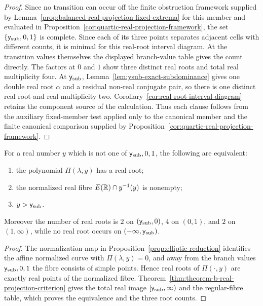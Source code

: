 \begin{proof}
Since no transition can occur off the finite obstruction framework supplied by Lemma~\ref{prop:balanced-real-projection-fixed-extrema} for this member and evaluated in Proposition~\ref{cor:quartic-real-projection-framework}, the set \(\{\mathsf{y}_{\mathrm{sub}},0,1\}\) is complete.  Since each of its three points separates adjacent cells with different counts, it is minimal for this real-root interval diagram.
At the transition values themselves the displayed branch-value table gives the count directly.  The factors at \(0\) and \(1\) show three distinct real roots and total real multiplicity four.  At \(\mathsf{y}_{\mathrm{sub}}\), Lemma~\ref{lem:ysub-exact-subdominance} gives one double real root \(\alpha\) and a residual non-real conjugate pair, so there is one distinct real root and real multiplicity two.
Corollary~\ref{cor:real-root-interval-diagram} retains the component source of the calculation.  Thus each clause follows from the auxiliary fixed-member test applied only to the canonical member and the finite canonical comparison supplied by Proposition~\ref{cor:quartic-real-projection-framework}.
\end{proof}

\begin{proposition}\label{prop:canonical-real-solvability-obstruction}
For a real number \(y\) which is not one of \(\mathsf{y}_{\mathrm{sub}},0,1\), the following are equivalent:
\begin{enumerate}
\item the polynomial \(\Pi(\lambda,y)\) has a real root;
\item the normalized real fibre \(E(\mathbb{R})\cap y^{-1}(y)\) is nonempty;
\item \(y>\mathsf{y}_{\mathrm{sub}}\).
\end{enumerate}
Moreover the number of real roots is \(2\) on \((\mathsf{y}_{\mathrm{sub}},0)\), \(4\) on \((0,1)\), and \(2\) on \((1,\infty)\), while no real root occurs on \((-\infty,\mathsf{y}_{\mathrm{sub}})\).
\end{proposition}

\begin{proof}
The normalization map in Proposition~\ref{prop:elliptic-reduction} identifies the affine normalized curve with \(\Pi(\lambda,y)=0\), and away from the branch values \(\mathsf{y}_{\mathrm{sub}},0,1\) the fibre consists of simple points.  Hence real roots of \(\Pi(\cdot,y)\) are exactly real points of the normalized fibre.  Theorem~\ref{thm:theorem-b-real-projection-criterion} gives the total real image \([\mathsf{y}_{\mathrm{sub}},\infty)\) and the regular-fibre table, which proves the equivalence and the three root counts.
\end{proof}

